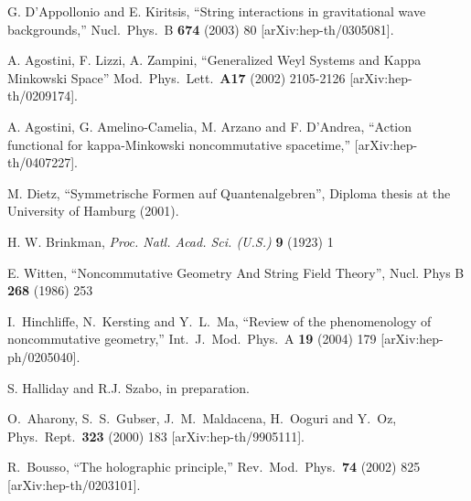 \begin{thebibliography}{199}
  G. D'Appollonio and E. Kiritsis,
  ``String interactions in gravitational wave backgrounds,''
  Nucl.\ Phys.\ B {\bf 674} (2003) 80
  [arXiv:hep-th/0305081].

  A. Agostini, F. Lizzi, A. Zampini,
  ``Generalized Weyl Systems and Kappa Minkowski Space''
  Mod.\ Phys.\ Lett.\ {\bf A17} (2002) 2105-2126
  [arXiv:hep-th/0209174].

  A. Agostini, G. Amelino-Camelia, M. Arzano and F. D'Andrea,
  ``Action functional for kappa-Minkowski noncommutative spacetime,''
  [arXiv:hep-th/0407227].

  M. Dietz,
  ``Symmetrische Formen auf Quantenalgebren'',
  Diploma thesis at the University of Hamburg (2001).

 H. W. Brinkman, \textit{Proc. Natl. Acad. Sci. (U.S.)}
  \textbf{9} (1923) 1

 E. Witten, ``Noncommutative Geometry And String Field Theory'',
  Nucl. Phys B {\bf 268} (1986) 253 

  I.~Hinchliffe, N.~Kersting and Y.~L.~Ma,
  ``Review of the phenomenology of noncommutative geometry,''
  Int.\ J.\ Mod.\ Phys.\ A {\bf 19} (2004) 179
  [arXiv:hep-ph/0205040].

 S. Halliday and R.J. Szabo, in preparation.

  O.~Aharony, S.~S.~Gubser, J.~M.~Maldacena, H.~Ooguri and Y.~Oz,
  Phys.\ Rept.\  {\bf 323} (2000) 183
  [arXiv:hep-th/9905111].

  R.~Bousso,
  ``The holographic principle,''
  Rev.\ Mod.\ Phys.\  {\bf 74} (2002) 825
  [arXiv:hep-th/0203101].
  
\end{thebibliography}


